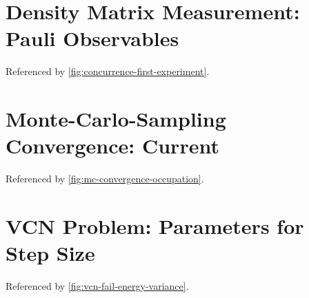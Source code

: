 \begin{minipage}{\textwidth}
    \section{Density Matrix Measurement: Pauli Observables}
        \label{appendix:pauli-measurements}
        Referenced by \autoref{fig:concurrence-first-experiment}.\\
        \vbox{
        }
\end{minipage}

\begin{minipage}{\textwidth}
    \section{Monte-Carlo-Sampling Convergence: Current}
        \label{appendix:mc-convergence-spin-current}
        Referenced by \autoref{fig:mc-convergence-occupation}.\\
        \vbox{
        }
\end{minipage}

\begin{minipage}{\textwidth}
    \section{VCN Problem: Parameters for Step Size}
        \label{appendix:vcn-fail-parameters}
        Referenced by \autoref{fig:vcn-fail-energy-variance}.\\
        \vbox{
        }
\end{minipage}

